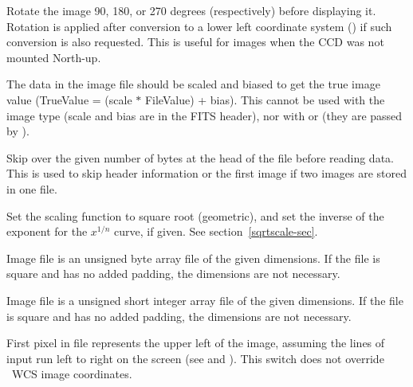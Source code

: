 \begin{description}

Rotate the image 90, 180, or 270 degrees (respectively) before
displaying it.  Rotation is applied after conversion to a lower
left coordinate system () if such conversion is also requested.
This is useful for images when the CCD was not mounted North-up.


The data in the image file should be scaled and biased to get
the true image value (TrueValue = (scale $*$ FileValue) + bias).
This cannot be used with the  image type (scale and bias
are in the FITS header), nor with  or 
(they are passed by \IRAF).


Skip over the given number of bytes at the head of the file before
reading	data.  This is used to skip header information or the first
image if two images are stored in one file.


Set the scaling function to square root (geometric), and set the
inverse of the exponent for the $x^{1/n}$ curve, if given.
See section~\ref{sqrtscale-sec}.


Image file is an unsigned byte array file of the given dimensions.
If the file is square and has no added padding, the dimensions
are not necessary.


Image file is a unsigned short integer array file of the given
dimensions.  If the file is square and has no added padding, the
dimensions are not necessary.


First pixel in file represents the upper left of the image,
assuming the lines of input run left to right on the screen
(see  and ).
This switch does not override \IRAF\ WCS image coordinates.


\end{description}
